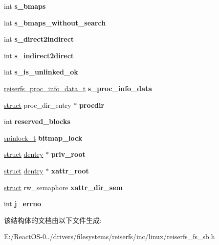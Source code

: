 \begin{DoxyCompactItemize}
int {\bfseries s\+\_\+bmaps}
\item 
\mbox{\label{structreiserfs__sb__info_ae156eb95410d05ca2d969a7fb4ffb955}} 
int {\bfseries s\+\_\+bmaps\+\_\+without\+\_\+search}
\item 
\mbox{\label{structreiserfs__sb__info_a113cc4454f01cf38d600d83475682799}} 
int {\bfseries s\+\_\+direct2indirect}
\item 
\mbox{\label{structreiserfs__sb__info_afc33b967bef86fd629293f55590fa163}} 
int {\bfseries s\+\_\+indirect2direct}
\item 
\mbox{\label{structreiserfs__sb__info_a373af6da8c8f988c92e9aaa974dfa30d}} 
int {\bfseries s\+\_\+is\+\_\+unlinked\+\_\+ok}
\item 
\mbox{\label{structreiserfs__sb__info_ae4f51636b9abaad4fb30a39181534443}} 
\hyperlink{structreiserfs__proc__info__data}{reiserfs\+\_\+proc\+\_\+info\+\_\+data\+\_\+t} {\bfseries s\+\_\+proc\+\_\+info\+\_\+data}
\item 
\mbox{\label{structreiserfs__sb__info_a24f55651511a31e70b1aa0048b2fc8a3}} 
\hyperlink{interfacestruct}{struct} proc\+\_\+dir\+\_\+entry $\ast$ {\bfseries procdir}
\item 
\mbox{\label{structreiserfs__sb__info_a6668f6b75f77612a1e427cbc93f39d67}} 
int {\bfseries reserved\+\_\+blocks}
\item 
\mbox{\label{structreiserfs__sb__info_acd36942730ec79c111c68dd36ff2699e}} 
\hyperlink{structspinlock__t}{spinlock\+\_\+t} {\bfseries bitmap\+\_\+lock}
\item 
\mbox{\label{structreiserfs__sb__info_aee26edc42ec0d179110d074f1441b26a}} 
\hyperlink{interfacestruct}{struct} \hyperlink{structdentry}{dentry} $\ast$ {\bfseries priv\+\_\+root}
\item 
\mbox{\label{structreiserfs__sb__info_a21b95f2f99e3fb29be7902b89f2e7304}} 
\hyperlink{interfacestruct}{struct} \hyperlink{structdentry}{dentry} $\ast$ {\bfseries xattr\+\_\+root}
\item 
\mbox{\label{structreiserfs__sb__info_adfdf3b3c7096bcb8d29dcc0637988d47}} 
\hyperlink{interfacestruct}{struct} rw\+\_\+semaphore {\bfseries xattr\+\_\+dir\+\_\+sem}
\item 
\mbox{\label{structreiserfs__sb__info_a91522b8b92104e95d06896529dfb288d}} 
int {\bfseries j\+\_\+errno}
\end{DoxyCompactItemize}


该结构体的文档由以下文件生成\+:\begin{DoxyCompactItemize}
\item 
E\+:/\+React\+O\+S-\/0../drivers/filesystems/reiserfs/inc/linux/reiserfs\+\_\+fs\+\_\+sb.\+h\end{DoxyCompactItemize}
